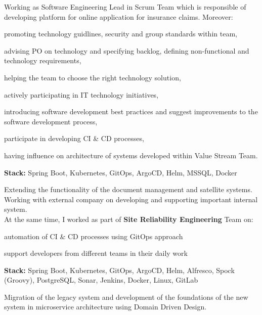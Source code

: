 Working as Software Engineering Lead in Scrum Team which is responsible of developing platform for online application for insurance claims.
Moreover:
\vspace{\topsep} %
\begin{tightemize}
\item promoting technology guidlines, security and group standards within team,
\item advising PO on technology and specifying backlog, defining non-functional and technology requirements,
\item helping the team to choose the right technology solution,
\item actively participating in IT technology initiatives,
\item introducing software development best practices and suggest improvements to the software development process,
\item participate in developing CI \& CD processes,
\item having influence on architecture of systems developed within Value Stream Team.
\end{tightemize}
\textbf{Stack:} Spring Boot, Kubernetes, GitOps, ArgoCD, Helm, MSSQL, Docker
\sectionsep

Extending the functionality of the document management and satellite systems. 
Working with external company on developing and supporting important internal system. \\
At the same time, I worked as part of \textbf{Site Reliability Engineering} Team on:
\begin{tightemize}
\item automation of CI \& CD processes using GitOps approach
\item support developers from different teams in their daily work
\end{tightemize}
\textbf{Stack:} Spring Boot, Kubernetes, GitOps, ArgoCD, Helm, Alfresco, Spock (Groovy), PostgreSQL, Sonar, Jenkins, Docker, Linux, GitLab
\sectionsep

Migration of the legacy system and development of the foundations of the new system in microservice architecture using Domain Driven Design.

